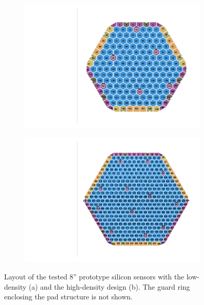 \begin{figure}
	\captionsetup[subfigure]{aboveskip=-1pt,belowskip=-1pt}
	\centering
	\begin{subfigure}[b]{0.50\textwidth}
		\includegraphics[width=0.999\textwidth]{plots/ch_mapping/LD.pdf}
		\subcaption{
		}
	\end{subfigure}
	\hfill
	\begin{subfigure}[b]{0.48\textwidth}
		\includegraphics[width=0.999\textwidth]{plots/ch_mapping/HD.pdf}
		\subcaption{
		}
	\end{subfigure}    
	\caption{
        Layout of the tested 8'' prototype silicon sensors with the low-density (a) and the high-density design (b).
		The guard ring enclosing the pad structure is not shown.
	}
	\label{fig:Sensors}
\end{figure}


